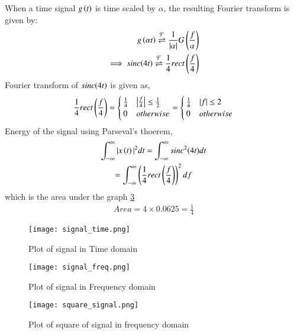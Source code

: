 \documentclass[journal,12pt,twocolumn]{IEEEtran}
\begin{document}
When a time signal $g\left(t\right)$ is time scaled by $\alpha$, the resulting Fourier transform is given by:
\begin{align}
    g\left(\alpha t\right) \overset{\mathcal{F}}{ \rightleftharpoons} \frac{1}{\vert\alpha\vert}G\left(\frac{f}{\alpha}\right)
    \label{scale} \\
    \implies sinc{\left(4t\right)} \overset{\mathcal{F}}{ \rightleftharpoons} \frac{1}{4}rect\left(\frac{f}{4}\right)
\end{align}
Fourier transform of $sinc{\left(4t\right)}$ is given as,
\begin{align}
    \frac{1}{4}rect\left(\frac{f}{4}\right) = 
    \begin{cases}
    \frac{1}{4} & \big{|}\frac{f}{4}\big{|}\leq  \frac{1}{2}\\
    0 & otherwise
    \end{cases}
     = 
    \begin{cases}
    \frac{1}{4} & |f| \leq  2\\
    0 & otherwise
     \end{cases}
\end{align}
Energy of the signal using Parseval's thoerem,
\begin{multline}
    \int_{-\infty}^{\infty} |x\left(t\right)|^{2} dt = \int_{-\infty}^{\infty} sinc^2{\left(4t\right)}  dt \\= \int_{-\infty}^{\infty} \left(\frac{1}{4}rect\left(\frac{f}{4}\right)\right)^2  df
\end{multline}
which is the area under the graph \ref{fig:rect_squared}
\begin{align}
    Area = 4 \times 0.0625 = \frac{1}{4}
\end{align}
\begin{figure}[h!]
\centering
\texttt{[image: signal\_time.png]}
\caption{Plot of signal in Time domain}
\label{fig:sig_time}
\end{figure}
\begin{figure}[h!]
\centering
\texttt{[image: signal\_freq.png]}
\caption{Plot of signal in Frequency domain}
\label{fig:sig_freq}
\end{figure}
\begin{figure}[h!]
\centering
\texttt{[image: square\_signal.png]}
\caption{Plot of square of signal in frequency domain}
\label{fig:rect_squared}
\end{figure}
\end{document}
